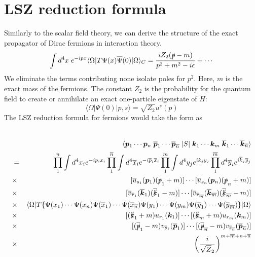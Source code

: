 \section{LSZ reduction formula}
\noindent
Similarly to the scalar field theory, we can derive the structure of the exact propagator of Dirac fermions in interaction theory.
\[\int d^4x \; e^{-ipx} \langle \Omega | T \Psi(x) \overline{\Psi}(0) | \Omega \rangle_C = \frac{iZ_2(\slashed{p}-m)}{p^2+m^2-i\epsilon} + \cdots \]
We eliminate the terms contributing none isolate poles for $p^2$. Here, $m$ is the exact mass of the fermions. The constant $Z_2$ is the probability for the quantum field to create or annihilate an exact one-particle eigenstate of $H$:
\[\langle \Omega | \Psi(0) | p,s \rangle = \sqrt{Z_2} u^s(p)\]
The LSZ reduction formula for fermions would take the form as \\ \\
\begin{newthem}
\begin{eqnarray}
&\phantom{=}& \langle \bm{p}_1 \cdots \bm{p}_n \;
\overline{\bm{p}}_1 \cdots \overline{\bm{p}}_{\overline{n}} \;
| S | \;
\bm{k}_1 \cdots \bm{k}_m \;
\overline{\bm{k}}_1 \cdots \overline{\bm{k}}_{\overline{n}} \rangle 
\nonumber \\
&=& \quad \prod_1^n \int d^4 x_i e^{-i p_ix_i }
\prod_1^{\overline{n}} \int d^4 \overline{x}_i e^{-i \overline{p}_i\overline{x}_i }
\prod_1^m \int d^4 y_j e^{ik_jy_j}
\prod_1^{\overline{m}} d^4 \overline{y}_i e^{i\overline{k}_j\overline{y}_j}
\nonumber \\
&\times & [\overline{u}_{s_1}(\bm{p}_1)(\slashed{p}_1+m)] \cdots [\overline{u}_{s_n}(\bm{p}_n)(\slashed{p}_n+m)]
\nonumber \\
&\times & [\overline{v}_{\overline{r}_1}(\overline{\bm{k}}_1)(\overline{\slashed{k}}_1 - m)] \cdots [\overline{v}_{\overline{r}_{\overline{m}}}(\overline{\bm{k}}_{\overline{m}})(\overline{\slashed{k}}_{\overline{m}} - m)]
\nonumber \\
&\times & \langle \Omega | T \{\Psi(x_1) \cdots \Psi(x_n)
\overline{\Psi}(\overline{x}_1) \cdots \overline{\Psi}(\overline{x}_{\overline{n}}) 
\overline{\Psi}(y_1) \cdots \overline{\Psi}(y_m)
\Psi(\overline{y}_1) \cdots \Psi(\overline{y}_{\overline{m}})\} 
| \Omega \rangle 
\nonumber \\
&\times & [(\slashed{k}_1+m) u_{r_1}(\bm{k}_1)] \cdots [(\slashed{k}_m+m)u_{r_m}(\bm{k}_m)] \nonumber \\
&\times & [(\overline{\slashed{p}}_1 - m) v_{\overline{s}_1}(\overline{\bm{p}}_1)] \cdots [(\overline{\slashed{p}}_{\overline{n}} - m) v_{\overline{s}_{\overline{n}}}(\overline{\bm{p}}_{\overline{n}})] \nonumber \\
&\times & \left( \frac{i}{\sqrt{Z}_2} \right) ^{m+\overline{m}+n+\overline{n}} \nonumber
\end{eqnarray}
\end{newthem}
